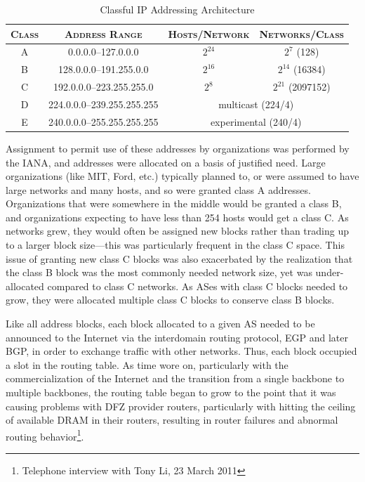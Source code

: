 \begin{table}[h]
\begin{centering}
\begin{singlespace}
\begin{tabular}{ c | c | c | c }
    \textsc{Class} & \textsc{Address Range} & \textsc{Hosts/Network} & \textsc{Networks/Class} \\
    \hline
	A & 0.0.0.0--127.0.0.0         & $2^{24}$ & $2^{7}$ (128)               \\
	B & 128.0.0.0--191.255.0.0     & $2^{16}$ & $2^{14}$ (16384)            \\
	C & 192.0.0.0--223.255.255.0   & $2^{8}$  & $2^{21}$ (2097152)          \\
	D & 224.0.0.0--239.255.255.255 & \multicolumn{2}{c}{multicast (224/4)} \\
	E & 240.0.0.0--255.255.255.255 & \multicolumn{2}{c}{experimental (240/4)}
\end{tabular}
\end{singlespace}
\end{centering}
\caption[Classful IP Addressing Architecture]{Classful IP Addressing Architecture \cite{rfc791}}
\end{table}

Assignment to permit use of these addresses by organizations was performed by the IANA, and addresses were allocated on a basis of justified need. Large organizations (like MIT, Ford, etc.) typically planned to, or were assumed to have large networks and many hosts, and so were granted class A addresses. Organizations that were somewhere in the middle would be granted a class B, and organizations expecting to have less than 254 hosts would get a class C. As networks grew, they would often be assigned new blocks rather than trading up to a larger block size---this was particularly frequent in the class C space. This issue of granting new class C blocks was also exacerbated by the realization that the class B block was the most commonly needed network size, yet was under-allocated compared to class C networks. As ASes with class C blocks needed to grow, they were allocated multiple class C blocks to conserve class B blocks.

Like all address blocks, each block allocated to a given AS needed to be announced to the Internet via the interdomain routing protocol, EGP and later BGP, in order to exchange traffic with other networks. Thus, each block occupied a slot in the routing table. As time wore on, particularly with the commercialization of the Internet and the transition from a single backbone to multiple backbones, the routing table began to grow to the point that it was causing problems with DFZ provider routers, particularly with hitting the ceiling of available DRAM in their routers, resulting in router failures and abnormal routing behavior\footnote{Telephone interview with Tony Li, 23 March 2011}.


